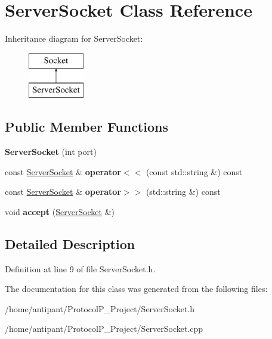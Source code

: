 \hypertarget{classServerSocket}{\section{Server\-Socket Class Reference}
\label{classServerSocket}
}
Inheritance diagram for Server\-Socket\-:\begin{figure}[H]
\begin{center}
\leavevmode
\includegraphics[height=2.000000cm]{classServerSocket}
\end{center}
\end{figure}
\subsection*{Public Member Functions}
\begin{DoxyCompactItemize}
\item 
\hypertarget{classServerSocket_a3dc1a31f740e4a8d69ae10c5dcb547d6}{{\bfseries Server\-Socket} (int port)}\label{classServerSocket_a3dc1a31f740e4a8d69ae10c5dcb547d6}

\item 
\hypertarget{classServerSocket_ab5fe4b2d92d7014f7663c1bbacbbeda5}{const \hyperlink{classServerSocket}{Server\-Socket} \& {\bfseries operator$<$$<$} (const std\-::string \&) const }\label{classServerSocket_ab5fe4b2d92d7014f7663c1bbacbbeda5}

\item 
\hypertarget{classServerSocket_a6bfabf01766bdb2c7f53274d8d771212}{const \hyperlink{classServerSocket}{Server\-Socket} \& {\bfseries operator$>$$>$} (std\-::string \&) const }\label{classServerSocket_a6bfabf01766bdb2c7f53274d8d771212}

\item 
\hypertarget{classServerSocket_ae550e314a988575d05b1dec1c3c18020}{void {\bfseries accept} (\hyperlink{classServerSocket}{Server\-Socket} \&)}\label{classServerSocket_ae550e314a988575d05b1dec1c3c18020}

\end{DoxyCompactItemize}


\subsection{Detailed Description}


Definition at line 9 of file Server\-Socket.\-h.



The documentation for this class was generated from the following files\-:\begin{DoxyCompactItemize}
\item 
/home/antipant/\-Protocol\-P\-\_\-\-Project/Server\-Socket.\-h\item 
/home/antipant/\-Protocol\-P\-\_\-\-Project/Server\-Socket.\-cpp\end{DoxyCompactItemize}
